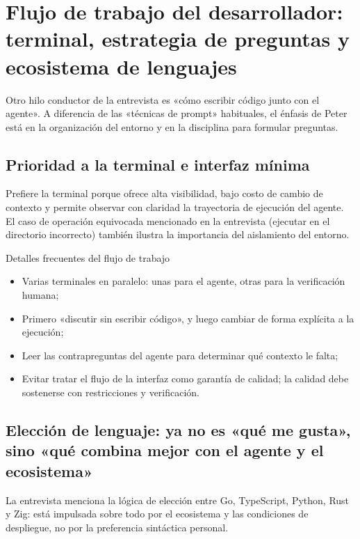 \section{Flujo de trabajo del desarrollador: terminal, estrategia de preguntas y ecosistema de lenguajes}

Otro hilo conductor de la entrevista es «cómo escribir código junto con el agente». A diferencia de las «técnicas de prompt» habituales, el énfasis de Peter está en la organización del entorno y en la disciplina para formular preguntas.

\subsection{Prioridad a la terminal e interfaz mínima}

Prefiere la terminal porque ofrece alta visibilidad, bajo costo de cambio de contexto y permite observar con claridad la trayectoria de ejecución del agente. El caso de operación equivocada mencionado en la entrevista (ejecutar en el directorio incorrecto) también ilustra la importancia del aislamiento del entorno.

\begin{knowledgebox}{Detalles frecuentes del flujo de trabajo}
\begin{itemize}
    \item Varias terminales en paralelo: unas para el agente, otras para la verificación humana;
    \item Primero «discutir sin escribir código», y luego cambiar de forma explícita a la ejecución;
    \item Leer las contrapreguntas del agente para determinar qué contexto le falta;
    \item Evitar tratar el flujo de la interfaz como garantía de calidad; la calidad debe sostenerse con restricciones y verificación.
\end{itemize}
\end{knowledgebox}

\subsection{Elección de lenguaje: ya no es «qué me gusta», sino «qué combina mejor con el agente y el ecosistema»}

La entrevista menciona la lógica de elección entre Go, TypeScript, Python, Rust y Zig: está impulsada sobre todo por el ecosistema y las condiciones de despliegue, no por la preferencia sintáctica personal.

